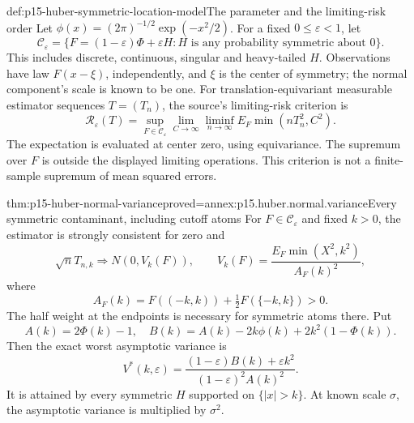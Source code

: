 \begin{hbdefinition}{def:p15-huber-symmetric-location-model}{The parameter and the limiting-risk order}
Let \(\phi(x)=(2\pi)^{-1/2}\exp(-x^2/2)\).
For a fixed \(0\leq\varepsilon<1\), let
\[
 \mathcal C_\varepsilon
   =\{F=(1-\varepsilon)\Phi+\varepsilon H:
                         H\text{ is any probability symmetric about }0\}.
\]
This includes discrete, continuous, singular and heavy-tailed \(H\).
Observations have law \(F(x-\xi)\), independently, and \(\xi\) is
the center of symmetry; the normal component's scale is known to be one.
For translation-equivariant measurable estimator sequences \(T=(T_n)\),
the source's limiting-risk criterion is
\[
 \mathcal R_\varepsilon(T)=
 \sup_{F\in\mathcal C_\varepsilon}
 \lim_{C\to\infty}\liminf_{n\to\infty}
             E_F\min(nT_n^2,C^2).
\]
The expectation is evaluated at center zero, using equivariance.
The supremum over \(F\) is outside the displayed limiting operations.
This criterion is not a finite-sample supremum of mean squared errors.
\end{hbdefinition}

\begin{hbtheorem}{thm:p15-huber-normal-variance}{proved=annex:p15.huber.normal.variance}{Every symmetric contaminant, including cutoff atoms}
For \(F\in\mathcal C_\varepsilon\) and fixed \(k>0\), the estimator
is strongly consistent for zero and
\[
 \sqrt n T_{n,k}\Rightarrow N(0,V_k(F)),\qquad
 V_k(F)=\frac{E_F\min(X^2,k^2)}{A_F(k)^2},
\]
where
\[
 A_F(k)=F((-k,k))+\tfrac12F(\{-k,k\})>0.
\]
The half weight at the endpoints is necessary for symmetric atoms there.
Put
\[
 A(k)=2\Phi(k)-1,\quad
 B(k)=A(k)-2k\phi(k)+2k^2(1-\Phi(k)).
\]
Then the exact worst asymptotic variance is
\[
 V^*(k,\varepsilon)=
 \frac{(1-\varepsilon)B(k)+\varepsilon k^2}
      {(1-\varepsilon)^2A(k)^2}.
\]
It is attained by every symmetric \(H\) supported on \(\{|x|>k\}\).
At known scale \(\sigma\), the asymptotic variance is multiplied by
\(\sigma^2\).
\end{hbtheorem}

